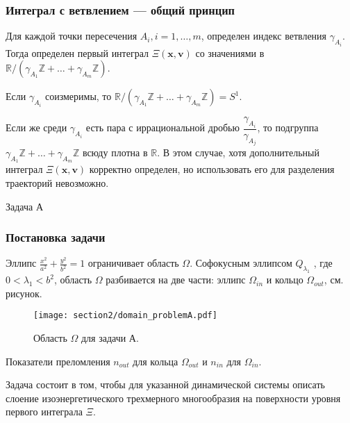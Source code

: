 \begin{frame}\frametitle{Интеграл с ветвлением --- общий принцип}

\qq
Для каждой точки пересечения $A_i, i=1,\ldots,m$, определен индекс ветвления $\gamma_{A_i}$. Тогда определен первый  интеграл   $\Xi(\mathbf{x}, \mathbf{v})$ со значениями в $\mathbb{R}/(\gamma_{A_1} \mathbb{Z}+ \ldots + \gamma_{A_m} \mathbb{Z})$. 

\qq Если $\gamma_{A_i}$ соизмеримы, то $\mathbb{R}/(\gamma_{A_1} \mathbb{Z}+ \ldots + \gamma_{A_m} \mathbb{Z}) = S^1$. 

\qq Если же среди $\gamma_{A_i}$ есть пара с иррациональной дробью $\dfrac{\gamma_{A_i}}{\gamma_{A_j}}$, то подгруппа $\gamma_{A_1} \mathbb{Z}+ \ldots + \gamma_{A_m} \mathbb{Z}$ всюду плотна в $\mathbb{R}$. В этом случае, хотя дополнительный интеграл $\Xi(\mathbf{x}, \mathbf{v})$ корректно определен, но использовать его для разделения траекторий невозможно.
\end{frame}



\begin{frame}
\LARGE\center Задача А
\end{frame}

\begin{frame}\frametitle{Постановка задачи}

\qq Эллипс $\frac{x^2}{a^2} + \frac{y^2}{b^2} =1$
ограничивает область $\Omega$.
Софокусным эллипсом $Q_{\lambda_1}$ , где $0 < \lambda_1 < b^2$, область $\Omega$ разбивается на две части: эллипс $\Omega_{in}$ и кольцо $\Omega_{out}$, см. рисунок.
\begin{figure}[!htb]
\centering
\texttt{[image: section2/domain\_problemA.pdf]}
    \caption{Область $\Omega$ для задачи А.}
    \label{fig:sect2_problemA}
\end{figure}

\qq Показатели преломления $n_{out}$ для кольца $\Omega_{out}$ и $n_{in}$ для $\Omega_{in}$.

\qq Задача состоит в том, чтобы для указанной динамической системы описать слоение изоэнергетического трехмерного многообразия  на поверхности уровня первого интеграла $\Xi$.
\end{frame}

